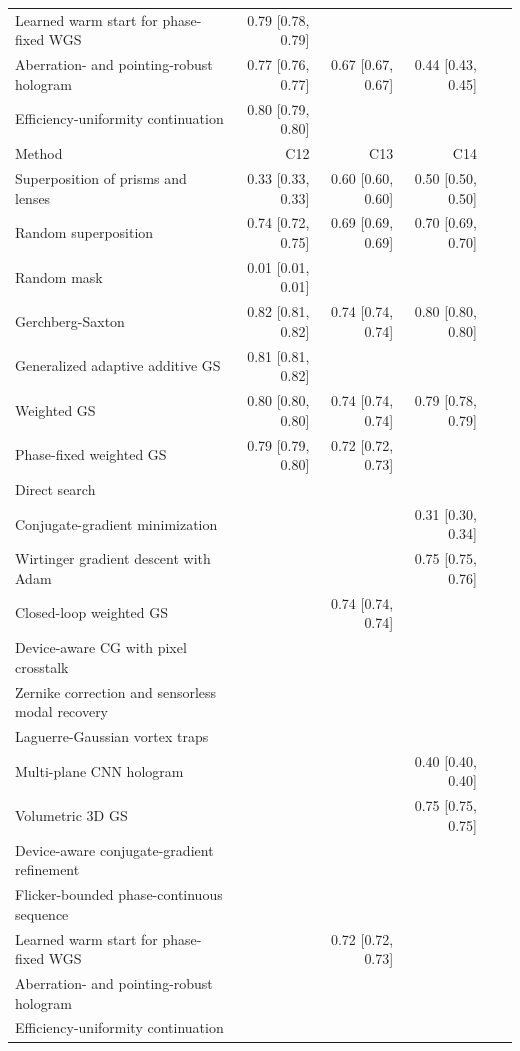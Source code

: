 \begin{longtable}{@{}>{\raggedright\arraybackslash}p{} rrrrr@{}}
Learned warm start for phase-fixed WGS & 0.79 [0.78, 0.79] &  &  &  &\\
Aberration- and pointing-robust hologram & 0.77 [0.76, 0.77] & 0.67 [0.67, 0.67] & 0.44 [0.43, 0.45] &  &\\
Efficiency-uniformity continuation & 0.80 [0.79, 0.80] &  &  &  &\\
\midrule
Method & C12 & C13 & C14 & &\\
\midrule
Superposition of prisms and lenses & 0.33 [0.33, 0.33] & 0.60 [0.60, 0.60] & 0.50 [0.50, 0.50] & &\\
Random superposition & 0.74 [0.72, 0.75] & 0.69 [0.69, 0.69] & 0.70 [0.69, 0.70] & &\\
Random mask & 0.01 [0.01, 0.01] &  &  & &\\
Gerchberg-Saxton & 0.82 [0.81, 0.82] & 0.74 [0.74, 0.74] & 0.80 [0.80, 0.80] & &\\
Generalized adaptive additive GS & 0.81 [0.81, 0.82] &  &  & &\\
Weighted GS & 0.80 [0.80, 0.80] & 0.74 [0.74, 0.74] & 0.79 [0.78, 0.79] & &\\
Phase-fixed weighted GS & 0.79 [0.79, 0.80] & 0.72 [0.72, 0.73] &  & &\\
Direct search &  &  &  & &\\
Conjugate-gradient minimization &  &  & 0.31 [0.30, 0.34] & &\\
Wirtinger gradient descent with Adam &  &  & 0.75 [0.75, 0.76] & &\\
Closed-loop weighted GS &  & 0.74 [0.74, 0.74] &  & &\\
Device-aware CG with pixel crosstalk &  &  &  & &\\
Zernike correction and sensorless modal recovery &  &  &  & &\\
Laguerre-Gaussian vortex traps &  &  &  & &\\
Multi-plane CNN hologram &  &  & 0.40 [0.40, 0.40] & &\\
Volumetric 3D GS &  &  & 0.75 [0.75, 0.75] & &\\
Device-aware conjugate-gradient refinement &  &  &  & &\\
Flicker-bounded phase-continuous sequence &  &  &  & &\\
Learned warm start for phase-fixed WGS &  & 0.72 [0.72, 0.73] &  & &\\
Aberration- and pointing-robust hologram &  &  &  & &\\
Efficiency-uniformity continuation &  &  &  & &\\
\bottomrule\end{longtable}
\endgroup
